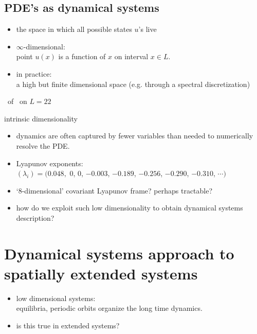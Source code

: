 \documentclass{beamer}
\begin{document}
\subsection{PDE's as dynamical systems}

\begin{frame}
\begin{block}{\statesp}
 \begin{itemize}
	\item the space in which all possible states $u$'s live
	\item $\infty$-dimensional:
\\
point $u(x)$ is a function of $x$ on interval $x \in L$.
	\item in practice:
\\
a high but finite dimensional space
     (e.g. through a spectral discretization)
 \end{itemize}
\end{block}
\end{frame}

\begin{frame}{\statesp\ of \KS\ on $L=22$}
\begin{block}{intrinsic dimensionality}
 \begin{itemize}
  \item dynamics are often captured by fewer variables than
        needed to numerically resolve the PDE.
  \item Lyapunov exponents: \\
	$(\lambda_i) = (0.048,$ 0, 0, $-0.003$, $-0.189$, $-0.256$, $-0.290$, $-0.310$, $\cdots)$
  \item `8-dimensional' covariant Lyapunov frame? perhaps tractable?	
  \item how do we exploit such low dimensionality to obtain
  dynamical systems description?
 \end{itemize}
\end{block}
\end{frame}

\section[Dynamicist's view of turbulence]
{Dynamical systems approach to spatially extended systems}

\begin{frame}{}
 \begin{itemize}
  \item low dimensional systems:
  \\
  equilibria, periodic
  orbits organize the long time dynamics.
  \item is this true in extended systems?
 \end{itemize}
\end{frame}
\end{document}
